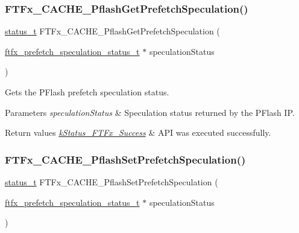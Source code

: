 \subsubsection{\texorpdfstring{FTFx\_CACHE\_PflashGetPrefetchSpeculation()}{FTFx\_CACHE\_PflashGetPrefetchSpeculation()}}
{\footnotesize\ttfamily \mbox{\hyperlink{group__ksdk__common_gaaabdaf7ee58ca7269bd4bf24efcde092}{status\+\_\+t}} F\+T\+Fx\+\_\+\+C\+A\+C\+H\+E\+\_\+\+Pflash\+Get\+Prefetch\+Speculation (\begin{DoxyParamCaption}\item[{\mbox{\hyperlink{group__ftfx__cache__driver_ga4ee23b743843fdca0f97dfbb91c105b7}{ftfx\+\_\+prefetch\+\_\+speculation\+\_\+status\+\_\+t}} $\ast$}]{speculation\+Status }\end{DoxyParamCaption})}



Gets the P\+Flash prefetch speculation status. 


\begin{DoxyParams}{Parameters}
{\em speculation\+Status} & Speculation status returned by the P\+Flash IP. \\
\hline
\end{DoxyParams}

\begin{DoxyRetVals}{Return values}
{\em \mbox{\hyperlink{group__ftfx__controller_gga458e651af6690959efa2afb96be7d609a8825e5cb3b30edfd6a26897eef4c66a3}{k\+Status\+\_\+\+F\+T\+Fx\+\_\+\+Success}}} & A\+PI was executed successfully. \\
\hline
\end{DoxyRetVals}
\mbox{\label{group__ftfx__cache__driver_ga00b01fe1b09708867e1302f35da35e0d}} 
\subsubsection{\texorpdfstring{FTFx\_CACHE\_PflashSetPrefetchSpeculation()}{FTFx\_CACHE\_PflashSetPrefetchSpeculation()}}
{\footnotesize\ttfamily \mbox{\hyperlink{group__ksdk__common_gaaabdaf7ee58ca7269bd4bf24efcde092}{status\+\_\+t}} F\+T\+Fx\+\_\+\+C\+A\+C\+H\+E\+\_\+\+Pflash\+Set\+Prefetch\+Speculation (\begin{DoxyParamCaption}\item[{\mbox{\hyperlink{group__ftfx__cache__driver_ga4ee23b743843fdca0f97dfbb91c105b7}{ftfx\+\_\+prefetch\+\_\+speculation\+\_\+status\+\_\+t}} $\ast$}]{speculation\+Status }\end{DoxyParamCaption})}



